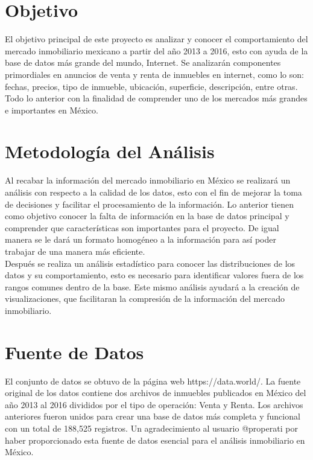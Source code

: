 \documentclass{report}
\begin{document}
    
    \section{Objetivo}
    El objetivo principal de este proyecto es analizar y conocer el comportamiento del mercado inmobiliario mexicano a partir del año 2013 a 2016, esto con ayuda de la base de datos más grande del mundo, Internet. Se analizarán componentes primordiales en anuncios de venta y renta de inmuebles en internet, como lo son: fechas, precios, tipo de inmueble, ubicación, superficie, descripción, entre otras. Todo lo anterior con la finalidad de comprender uno de los mercados más grandes e importantes en México.
    
    \section{Metodología del Análisis}
	Al recabar la información del mercado inmobiliario en México se realizará un análisis con respecto a la calidad de los datos, esto con el fin de mejorar la toma de decisiones y facilitar el procesamiento de la información. Lo anterior tienen como objetivo conocer la falta de información en la base de datos principal y comprender que características son importantes para el proyecto. De igual manera se le dará un formato homogéneo a la información para así poder trabajar de una manera más eficiente. \\
	
	Después se realiza un análisis estadístico para conocer las distribuciones de los datos y su comportamiento, esto es necesario para identificar valores fuera de los rangos comunes dentro de la base. Este mismo análisis ayudará a la creación de visualizaciones, que facilitaran la compresión de la información del mercado inmobiliario.
	
	\section{Fuente de Datos}
	El conjunto de datos se obtuvo de la página web https://data.world/. La fuente original de los datos contiene dos archivos de inmuebles publicados en México del año 2013 al 2016 divididos por el tipo de operación: Venta y Renta. Los archivos anteriores fueron unidos para crear una base de datos más completa y funcional con un total de 188,525 registros. Un agradecimiento al usuario @properati por haber proporcionado esta fuente de datos esencial para el análisis inmobiliario en México.
	
\end{document}
